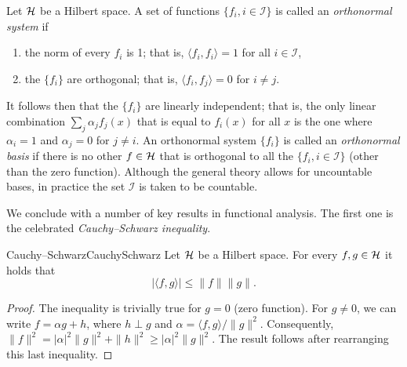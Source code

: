 Let \(\mathcal{H}\) be a Hilbert space. A set of functions \(\{f_i, i \in \mathcal{I}\}\) is called an \textit{orthonormal system} if
\begin{enumerate}
	\item the norm of every \(f_i\) is 1; that is, \(\langle f_i, f_i \rangle = 1\) for all \(i \in \mathcal{I}\),
	\item the \(\{f_i\}\) are orthogonal; that is, \(\langle f_i, f_j \rangle = 0\) for \(i \neq j\).
\end{enumerate}
It follows then that the \(\{f_i\}\) are linearly independent; that is, the only linear combination \(\sum_j \alpha_j f_j(x)\) that is equal to \(f_i(x)\) for all \(x\) is the one where \(\alpha_i = 1\) and \(\alpha_j = 0\) for \(j \neq i\). An orthonormal system \(\{f_i\}\) is called an \textit{orthonormal basis} if there is no other \(f \in \mathcal{H}\) that is orthogonal to all the \(\{f_i, i \in \mathcal{I}\}\) (other than the zero function). Although the general theory allows for uncountable bases, in practice the set \(\mathcal{I}\) is taken to be countable.

We conclude with a number of key results in functional analysis. The first one is the celebrated \textit{Cauchy--Schwarz inequality}.

\begin{thm}{Cauchy--Schwarz}{CauchySchwarz}
	Let \(\mathcal{H}\) be a Hilbert space. For every \(f, g \in \mathcal{H}\) it holds that
	\begin{equation*}
		|\langle f, g \rangle| \le \|f\| \|g\|.
	\end{equation*}
\end{thm}

\begin{proof}
	The inequality is trivially true for \(g = 0\) (zero function). For \(g \neq 0\), we can write \(f = \alpha g + h\), where \(h \perp g\) and \(\alpha = \langle f, g \rangle / \|g\|^2\). Consequently, \(\|f\|^2 = |\alpha|^2 \|g\|^2 + \|h\|^2 \ge |\alpha|^2 \|g\|^2\). The result follows after rearranging this last inequality.
\end{proof}


